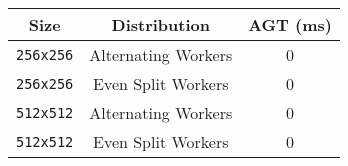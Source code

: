 {\footnotesize
\begin{tabular}{|c|c|c|}
    \hline Size & Distribution & AGT (ms) \\
    \hline \verb|256x256| & Alternating Workers & 0 \\
    \verb|256x256| & Even Split Workers & 0 \\
    \hline \verb|512x512| & Alternating Workers & 0 \\
    \verb|512x512| & Even Split Workers & 0 \\
    \hline
\end{tabular}}
